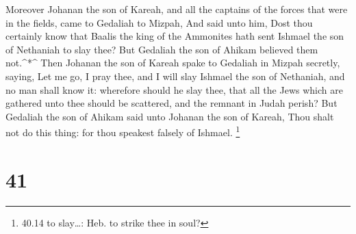  Moreover Johanan the son of Kareah, and all the captains
of the forces that were in the fields, came to Gedaliah to Mizpah,
 And said unto him, Dost thou certainly know that Baalis
the king of the Ammonites hath sent Ishmael the son of Nethaniah to slay
thee? But Gedaliah the son of Ahikam believed them not.\^{}*\^{}
 Then Johanan the son of Kareah spake to Gedaliah in Mizpah
secretly, saying, Let me go, I pray thee, and I will slay Ishmael the
son of Nethaniah, and no man shall know it: wherefore should he slay
thee, that all the Jews which are gathered unto thee should be
scattered, and the remnant in Judah perish?  But Gedaliah
the son of Ahikam said unto Johanan the son of Kareah, Thou shalt not do
this thing: for thou speakest falsely of Ishmael. \footnote{40.14 to
  slay\ldots: Heb. to strike thee in soul?}

\hypertarget{section-40}{%
\section{41}\label{section-40}}

